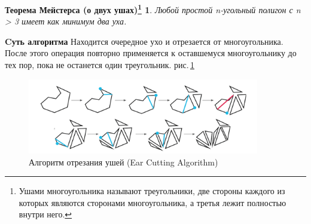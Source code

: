 \documentclass[11pt,a4paper]{extarticle}
\begin{document}
			{}{}%
			{\itshape}{}%
			{\bfseries}{}%
			{\newline}{}%
			\theoremstyle{break}
			\newtheorem*{theorem1}{Теорема Мейстерса (о двух ушах)\footnote{\label{ears}Ушами многоугольника называют треугольники, две стороны каждого из которых являются сторонами многоугольника, а третья лежит полностью внутри него.}}			
			\begin{theorem1}
				Любой простой n-угольный полигон с n > 3 имеет как минимум два уха.
			\end{theorem1}
			\noindent
			\textbf{Cуть алгоритма}\;\;
			Находится очередное ухо и отрезается от многоугольника. После этого операция повторно применяется к оставшемуся многоугольнику до тех пор, пока не останется один треугольник.	
			рис.\,\ref{earcut} 
			\begin{figure}[ht]
				\centering
				\includegraphics[width=0.9\textwidth]{earcut}
				\caption{Алгоритм отрезания ушей (Ear Cutting Algorithm)}
				\label{earcut}
			\end{figure}
			
			\newpage
\end{document}
